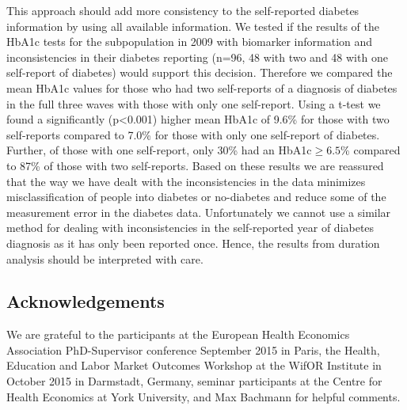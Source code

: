 \documentclass[12pt,english]{article}
\begin{document}
\begin{appendix}
This approach should add more consistency to the self-reported diabetes information by using all available information. We tested if the results of the \ac{HbA1c} tests for the subpopulation in 2009 with biomarker information and inconsistencies in their diabetes reporting (n=96, 48 with two and 48 with one self-report of diabetes) would support this decision. Therefore we compared the mean \ac{HbA1c} values for those who had two self-reports of a diagnosis of diabetes in the full three waves with those with only one self-report. Using a t-test we found a significantly (p<0.001) higher mean \ac{HbA1c} of 9.6\%
for those with two self-reports compared to 7.0\% for those with only one self-report of diabetes. Further, of those with one self-report, only 30\% had an \ac{HbA1c}$\geq6.5$\% compared to 87\% of those with two self-reports. Based on these results we are reassured that the way we have dealt with the inconsistencies in the data minimizes misclassification of people into diabetes or no-diabetes and reduce some of the measurement error in the diabetes data. Unfortunately we cannot use a similar method for dealing with inconsistencies in the self-reported year of diabetes diagnosis as it has only been reported once. Hence, the results from duration analysis should be interpreted with care.

\end{appendix}

\subsection*{Acknowledgements}

We are grateful to the participants at the European Health Economics Association PhD-Supervisor conference September 2015 in Paris, the Health, Education and Labor Market Outcomes Workshop at the WifOR Institute in October 2015 in Darmstadt, Germany, seminar participants at the Centre for Health Economics at York University, and Max Bachmann for helpful comments.



\printbibliography

%
\end{document}
